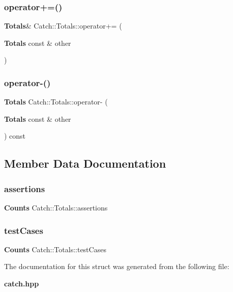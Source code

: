 \mbox{\label{struct_catch_1_1_totals_a574015076e54cc405c70b053e3356e43}} 
\subsubsection{operator+=()}
{\footnotesize\ttfamily \textbf{ Totals}\& Catch\+::\+Totals\+::operator+= (\begin{DoxyParamCaption}\item[{\textbf{ Totals} const \&}]{other }\end{DoxyParamCaption})\hspace{0.3cm}{\ttfamily [inline]}}

\mbox{\label{struct_catch_1_1_totals_a9279ed39139cb7e7b291918a6d08290e}} 
\subsubsection{operator-\/()}
{\footnotesize\ttfamily \textbf{ Totals} Catch\+::\+Totals\+::operator-\/ (\begin{DoxyParamCaption}\item[{\textbf{ Totals} const \&}]{other }\end{DoxyParamCaption}) const\hspace{0.3cm}{\ttfamily [inline]}}



\subsection{Member Data Documentation}
\mbox{\label{struct_catch_1_1_totals_a885ded66df752147b30c3d45aa602ec9}} 
\subsubsection{assertions}
{\footnotesize\ttfamily \textbf{ Counts} Catch\+::\+Totals\+::assertions}

\mbox{\label{struct_catch_1_1_totals_adb195fe477aedee2ecea88c888f16506}} 
\subsubsection{test\+Cases}
{\footnotesize\ttfamily \textbf{ Counts} Catch\+::\+Totals\+::test\+Cases}



The documentation for this struct was generated from the following file\+:\begin{DoxyCompactItemize}
\item 
\textbf{ catch.\+hpp}\end{DoxyCompactItemize}
